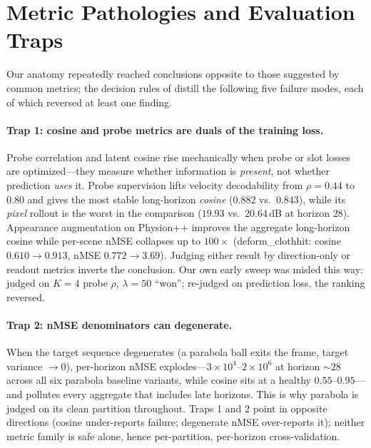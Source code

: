 \section{Metric Pathologies and Evaluation Traps}
\label{app:traps}

Our anatomy repeatedly reached conclusions opposite to those suggested by common metrics; the decision rules of  distill the following five failure modes, each of which reversed at least one finding.

\paragraph{Trap 1: cosine and probe metrics are duals of the training loss.}
Probe correlation and latent cosine rise mechanically when probe or slot losses are optimized---they measure whether information is \emph{present}, not whether prediction \emph{uses} it. Probe supervision lifts velocity decodability from $\rho{=}0.44$ to $0.80$ and gives the most stable long-horizon \emph{cosine} ($0.882$ vs.\ $0.843$), while its \emph{pixel} rollout is the worst in the comparison ($19.93$ vs.\ $20.64$\,dB at horizon $28$). Appearance augmentation on Physion++ improves the aggregate long-horizon cosine while per-scene nMSE collapses up to $100\times$ (deform\_clothhit: cosine $0.610\!\to\!0.913$, nMSE $0.772\!\to\!3.69$). Judging either result by direction-only or readout metrics inverts the conclusion. Our own early sweep was misled this way: judged on $K{=}4$ probe $\rho$, $\lambda{=}50$ ``won''; re-judged on prediction loss, the ranking reversed.

\paragraph{Trap 2: nMSE denominators can degenerate.}
When the target sequence degenerates (a parabola ball exits the frame, target variance ${\to}0$), per-horizon nMSE explodes---$3{\times}10^{4}$--$2{\times}10^{6}$ at horizon ${\sim}28$ across all six parabola baseline variants, while cosine sits at a healthy $0.55$--$0.95$---and pollutes every aggregate that includes late horizons. This is why parabola is judged on its clean \rmood{} partition throughout. Traps 1 and 2 point in opposite directions (cosine under-reports failure; degenerate nMSE over-reports it); neither metric family is safe alone, hence per-partition, per-horizon cross-validation.

